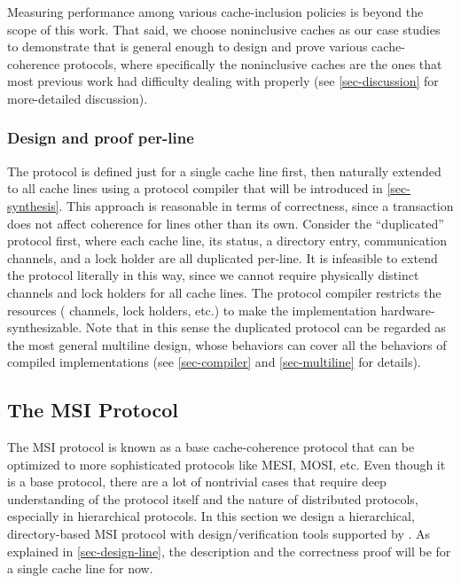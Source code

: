 \documentclass[sigplan,10pt,review,anonymous,screen]{acmart}\settopmatter{printfolios=true,printccs=false,printacmref=false}
\begin{document}
Measuring performance among various cache-inclusion policies is beyond the scope of this work.
That said, we choose noninclusive caches as our case studies to demonstrate that \hemiola{} is general enough to design and prove various cache-coherence protocols, where specifically the noninclusive caches are the ones that most previous work had difficulty dealing with properly (see \autoref{sec-discussion} for more-detailed discussion).

\subsubsection{Design and proof per-line}
\label{sec-design-line}

The protocol is defined just for a single cache line first, then naturally extended to all cache lines using a protocol compiler that will be introduced in \autoref{sec-synthesis}.
This approach is reasonable in terms of correctness, since a transaction does not affect coherence for lines other than its own.
Consider the ``duplicated'' protocol first, where each cache line, its status, a directory entry, communication channels, and a lock holder are all duplicated per-line.
It is infeasible to extend the protocol literally in this way, since we cannot require physically distinct channels and lock holders for all cache lines.
The protocol compiler restricts the resources (\eg{} channels, lock holders, etc.) to make the implementation hardware-synthesizable.
Note that in this sense the duplicated protocol can be regarded as the most general multiline design, whose behaviors can cover all the behaviors of compiled implementations (see \autoref{sec-compiler} and \autoref{sec-multiline} for details).

\subsection{The MSI Protocol}
\label{sec-msi-protocol}

\newcommand{\mesi}{\ensuremath{\textsf{MESI}}}
\newcommand{\msi}{\ensuremath{\textsf{MSI}}}
\newcommand{\stM}{\ensuremath{\textsf{M}}}
\newcommand{\stE}{\ensuremath{\textsf{E}}}
\newcommand{\stS}{\ensuremath{\textsf{S}}}
\newcommand{\stI}{\ensuremath{\textsf{I}}}
\newcommand{\dir}[2]{\ensuremath{#1_{\tuple{#2}}}}

The MSI protocol is known as a base cache-coherence protocol that can be optimized to more sophisticated protocols like MESI, MOSI, etc.
Even though it is a base protocol, there are a lot of nontrivial cases that require deep understanding of the protocol itself and the nature of distributed protocols, especially in hierarchical protocols.
In this section we design a hierarchical, directory-based MSI protocol with design/verification tools supported by \hemiola{}.
As explained in \autoref{sec-design-line}, the description and the correctness proof will be for a single cache line for now.
\end{document}
